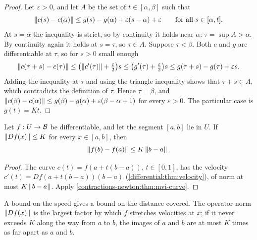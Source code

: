 \begin{notechapter}
\begin{proof}
Let $\varepsilon > 0$, and let $A$ be the set of $t\in[\alpha, \beta]$
such that
\[
  \left\|c(s) - c(\alpha)\right\|\leq g(s) - g(\alpha) + \varepsilon(s - \alpha)
  + \varepsilon \qquad\text{for all } s\in[\alpha, t] .
\]
At $s = \alpha$ the inequality is strict, so by continuity it holds near
$\alpha$: $\tau = \sup A > \alpha$. By continuity again it holds at
$s = \tau$, so $\tau\in A$. Suppose $\tau < \beta$. Both $c$ and $g$ are
differentiable at $\tau$, so for $s > 0$ small enough
\[
  \left\|c(\tau + s) - c(\tau)\right\|
  \leq\bigl(\left\|c'(\tau)\right\| + \tfrac\varepsilon2\bigr)s
  \leq\bigl(g'(\tau) + \tfrac\varepsilon2\bigr)s
  \leq g(\tau + s) - g(\tau) + \varepsilon s .
\]
Adding the inequality at $\tau$ and using the triangle inequality shows
that $\tau + s\in A$, which contradicts the definition of $\tau$. Hence
$\tau = \beta$, and
$\left\|c(\beta) - c(\alpha)\right\|\leq g(\beta) - g(\alpha)
+ \varepsilon(\beta - \alpha + 1)$ for every $\varepsilon > 0$. The
particular case is $g(t) = Kt$.
\end{proof}

\begin{theorem}\label{contractions-newton:thm:mvi}
Let $f:U\to\mathcal{B}$ be differentiable, and let the segment $[a, b]$ lie in
$U$. If $\left\|Df(x)\right\|\leq K$ for every $x\in[a, b]$, then
\[
  \left\|f(b) - f(a)\right\|\leq K\left\|b - a\right\| .
\]
\end{theorem}

\begin{proof}
The curve $c(t) = f(a + t(b - a))$, $t\in[0, 1]$, has the velocity
$c'(t) = Df(a + t(b - a))(b - a)$ (\cref{differential:thm:velocity}), of
norm at most $K\left\|b - a\right\|$. Apply
\cref{contractions-newton:thm:mvi-curve}.
\end{proof}

\begin{intuition}
A bound on the speed gives a bound on the distance covered. The operator
norm $\left\|Df(x)\right\|$ is the largest factor by which $f$ stretches
velocities at $x$; if it never exceeds $K$ along the way from $a$ to $b$,
the images of $a$ and $b$ are at most $K$ times as far apart as $a$ and
$b$.
\end{intuition}


\end{notechapter}

